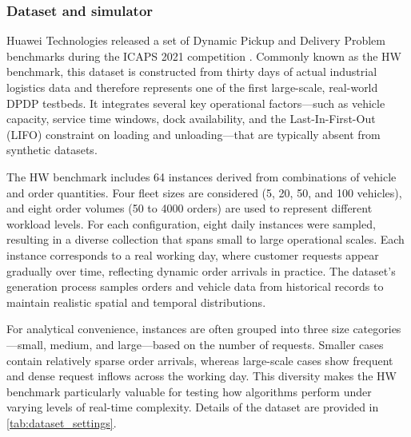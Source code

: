 \documentclass[]{interact}
\begin{document}
\subsubsection{Dataset and simulator} \label{ss:exp-data}


 Huawei Technologies released a set of Dynamic Pickup and Delivery Problem benchmarks during the ICAPS 2021 competition \cite{hao2022introduction}. Commonly known as the HW benchmark, this dataset is constructed from thirty days of actual industrial logistics data and therefore represents one of the first large-scale, real-world DPDP testbeds. It integrates several key operational factors—such as vehicle capacity, service time windows, dock availability, and the Last-In-First-Out (LIFO) constraint on loading and unloading—that are typically absent from synthetic datasets.

The HW benchmark includes 64 instances derived from combinations of vehicle and order quantities. Four fleet sizes are considered (5, 20, 50, and 100 vehicles), and eight order volumes (50 to 4000 orders) are used to represent different workload levels. For each configuration, eight daily instances were sampled, resulting in a diverse collection that spans small to large operational scales. Each instance corresponds to a real working day, where customer requests appear gradually over time, reflecting dynamic order arrivals in practice. The dataset’s generation process samples orders and vehicle data from historical records to maintain realistic spatial and temporal distributions.

For analytical convenience, instances are often grouped into three size categories—small, medium, and large—based on the number of requests. Smaller cases contain relatively sparse order arrivals, whereas large-scale cases show frequent and dense request inflows across the working day. This diversity makes the HW benchmark particularly valuable for testing how algorithms perform under varying levels of real-time complexity. Details of the dataset are provided in \autoref{tab:dataset_settings}.
\end{document}
